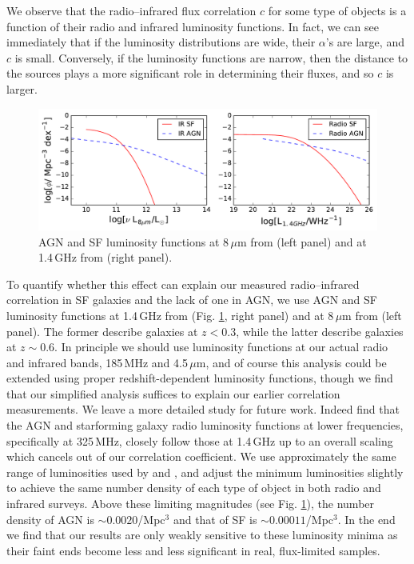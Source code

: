 \documentclass[numberedappendix]{emulateapj}
\begin{document}
We observe that the radio--infrared flux correlation $c$ for some type of objects is a function of their radio and infrared luminosity functions. In fact, we can see immediately that if the luminosity distributions are wide, their $\alpha$'s are large, and $c$ is small. Conversely, if the luminosity functions are narrow, then the distance to the sources plays a more significant role in determining their fluxes, and so $c$ is larger. 

\begin{figure}[h]
\centering
\includegraphics[width=6in]{sim_rad_ir_luminosity_functions.pdf}
\caption[AGN and SF luminosity functions at 8\,$\mu$m from (left) and at 1.4\,GHz (right).]{AGN and SF luminosity functions at 8\,$\mu$m from \citet{fu10} (left panel) and at 1.4\,GHz from \citet{mauch07} (right panel).}
\label{fig:luminosityfunctions}
\end{figure}

To quantify whether this effect can explain our measured radio--infrared correlation in SF galaxies and the lack of one in AGN, we use AGN and SF luminosity functions at 1.4\,GHz from \citet{mauch07} (Fig. \ref{fig:luminosityfunctions}, right panel) and at 8\,$\mu$m from \citet{fu10} (left panel). The former describe galaxies at $z<0.3$, while the latter describe galaxies at $z\sim0.6$. In principle we should use luminosity functions at our actual radio and infrared bands, 185\,MHz and 4.5\,$\mu$m, and of course this analysis could be extended using proper redshift-dependent luminosity functions, though we find that our simplified analysis suffices to explain our earlier correlation measurements. We leave a more detailed study for future work. Indeed \citet{prescott16} find that the AGN and starforming galaxy radio luminosity functions at lower frequencies, specifically at 325\,MHz, closely follow those at 1.4\,GHz up to an overall scaling which cancels out of our correlation coefficient. We use approximately the same range of luminosities used by \citet{mauch07} and \citet{fu10}, and adjust the minimum luminosities slightly to achieve the same number density of each type of object in both radio and infrared surveys. Above these limiting magnitudes (see Fig. \ref{fig:luminosityfunctions}), the number density of AGN is $\sim0.0020$/Mpc$^3$ and that of SF is $\sim0.00011$/Mpc$^3$. In the end we find that our results are only weakly sensitive to these luminosity minima as their faint ends become less and less significant in real, flux-limited samples. 
\end{document}
